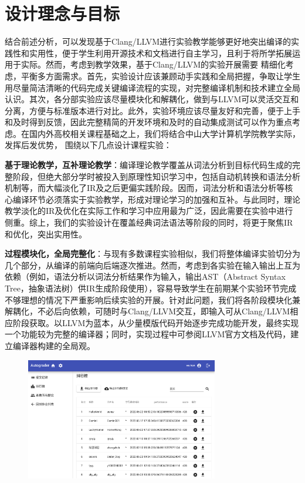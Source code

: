 \documentclass{SCIS2020cn}
\begin{document}
\section{设计理念与目标}
结合前述分析，可以发现基于Clang/LLVM进行实验教学能够更好地突出编译的实践性和实用性，便于学生利用开源技术和文档进行自主学习，且利于将所学拓展运用于实际。然而，考虑到教学效果，基于Clang/LLVM的实验开展需要
精细化考虑，平衡多方面需求。首先，实验设计应该兼顾动手实践和全局把握，争取让学生用尽量简洁清晰的代码完成关键编译流程的实现，对完整编译机制和技术建立全局认识。其次，各分部实验应该尽量模块化和解耦化，做到与LLVM可以灵活交互和分离，方便与标准版本进行对比。此外，实验环境应该尽量友好和完善，便于上手和及时得到反馈，因此完整精简的开发环境和及时的自动集成测试可以作为重点考虑。在国内外高校相关课程基础之上，我们将结合中山大学计算机学院教学实际，发挥后发优势，
围绕以下几点设计课程实验：



\textbf{基于理论教学，互补理论教学}：编译理论教学覆盖从词法分析到目标代码生成的完整阶段，但绝大部分学时被投入到原理性知识学习中，包括自动机转换和语法分析机制等，而大幅淡化了IR及之后更偏实践阶段。因而，词法分析和语法分析等核心编译环节必须落实于实验教学，形成对理论学习的加强和互补。与此同时，理论教学淡化的IR及优化在实际工作和学习中应用最为广泛，因此需要在实验中进行侧重。综上，我们的实验设计在覆盖经典词法语法等阶段的同时，将更于聚焦IR和优化，突出实用性。

\textbf{过程模块化，全局完整化}：与现有多数课程实验相似，我们将整体编译实验切分为几个部分，从编译的前端向后端逐次推进。然而，考虑到各实验在输入输出上互为依赖（例如，语法分析以词法分析结果作为输入，输出AST（Abstract Syntax Tree，抽象语法树）供IR生成阶段使用），容易导致学生在前期某个实验环节完成不够理想的情况下严重影响后续实验的开展。针对此问题，我们将各阶段模块化兼解耦化，不必后向依赖，可随时与Clang/LLVM交互，即输入可从Clang/LLVM相应阶段获取。以LLVM为蓝本，从少量模版代码开始逐步完成功能开发，最终实现一个功能较为完整的编译器；同时，实现过程中可参阅LLVM官方文档及代码，建立编译器构建的全局观。

\begin{figure}
    \centering
    \includegraphics[width=0.75\textwidth]{assets/image/rank.png}
    \label{rank}
\end{figure}
\end{document}
